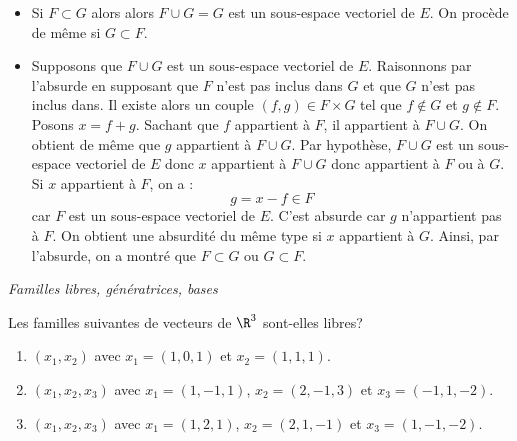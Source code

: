 \documentclass[a4paper,10pt]{report}
\begin{document}
\begin{itemize}
\item Si $F \subset G$ alors alors $F \cup G = G$ est un sous-espace vectoriel de $E$. On procède de même si $G \subset F$.
\item Supposons que $F \cup G$ est un sous-espace vectoriel de $E$. Raisonnons par l'absurde en supposant que $F$ n'est pas inclus dans $G$ et que $G$ n'est pas inclus dans. Il existe alors un couple $(f,g) \in F \times G$ tel que $f \notin G$ et $g \notin F$. Posons $x=f+g$. Sachant que $f$ appartient à $F$, il appartient à $F \cup G$. On obtient de même que $g$ appartient à $F \cup G$. Par hypothèse, $F \cup G$ est un sous-espace vectoriel de $E$ donc $x$ appartient à $F \cup G$ donc appartient à $F$ ou à $G$. Si $x$ appartient à $F$, on a :
$$ g = x-f \in F$$
car $F$ est un sous-espace vectoriel de $E$. C'est absurde car $g$ n'appartient pas à $F$. On obtient une absurdité du même type si $x$ appartient à $G$. Ainsi, par l'absurde, on a montré que $F \subset G$ ou $G \subset F$. 
\end{itemize}

\medskip

\begin{center}
\textit{{ {\large Familles libres, génératrices, bases}}}
\end{center}

\medskip

\begin{Exa} Les familles suivantes de vecteurs de $\R^3$ sont-elles libres?
   \begin{enumerate}
  \item
        $(x_1 ,x_2)$ avec $x_1 = (1,0,1)$ et $x_2 = (1,1,1)$.
      \item
        $(x_1 ,x_2 ,x_3)$ avec $x_1 = (1, - 1,1)$, $x_2 = (2, - 1,3)$ et $x_3 = ( - 1,1, - 2)$.
      \item
        $(x_1 ,x_2 ,x_3)$ avec $x_1 = (1,2,1)$, $x_2 = (2,1, - 1)$ et $x_3 = (1, - 1, - 2)$.
    \end{enumerate}
\end{Exa}

\corr 
\end{document}
